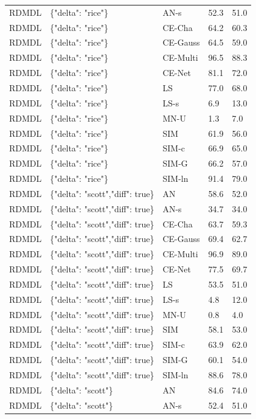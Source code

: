 \begin{tabular}{lllll}
RDMDL & \{"delta": "rice"\} & AN-s & 52.3 & 51.0 \\
RDMDL & \{"delta": "rice"\} & CE-Cha & 64.2 & 60.3 \\
RDMDL & \{"delta": "rice"\} & CE-Gauss & 64.5 & 59.0 \\
RDMDL & \{"delta": "rice"\} & CE-Multi & 96.5 & 88.3 \\
RDMDL & \{"delta": "rice"\} & CE-Net & 81.1 & 72.0 \\
RDMDL & \{"delta": "rice"\} & LS & 77.0 & 68.0 \\
RDMDL & \{"delta": "rice"\} & LS-s & 6.9 & 13.0 \\
RDMDL & \{"delta": "rice"\} & MN-U & 1.3 & 7.0 \\
RDMDL & \{"delta": "rice"\} & SIM & 61.9 & 56.0 \\
RDMDL & \{"delta": "rice"\} & SIM-c & 66.9 & 65.0 \\
RDMDL & \{"delta": "rice"\} & SIM-G & 66.2 & 57.0 \\
RDMDL & \{"delta": "rice"\} & SIM-ln & 91.4 & 79.0 \\
RDMDL & \{"delta": "scott","diff": true\} & AN & 58.6 & 52.0 \\
RDMDL & \{"delta": "scott","diff": true\} & AN-s & 34.7 & 34.0 \\
RDMDL & \{"delta": "scott","diff": true\} & CE-Cha & 63.7 & 59.3 \\
RDMDL & \{"delta": "scott","diff": true\} & CE-Gauss & 69.4 & 62.7 \\
RDMDL & \{"delta": "scott","diff": true\} & CE-Multi & 96.9 & 89.0 \\
RDMDL & \{"delta": "scott","diff": true\} & CE-Net & 77.5 & 69.7 \\
RDMDL & \{"delta": "scott","diff": true\} & LS & 53.5 & 51.0 \\
RDMDL & \{"delta": "scott","diff": true\} & LS-s & 4.8 & 12.0 \\
RDMDL & \{"delta": "scott","diff": true\} & MN-U & 0.8 & 4.0 \\
RDMDL & \{"delta": "scott","diff": true\} & SIM & 58.1 & 53.0 \\
RDMDL & \{"delta": "scott","diff": true\} & SIM-c & 63.9 & 62.0 \\
RDMDL & \{"delta": "scott","diff": true\} & SIM-G & 60.1 & 54.0 \\
RDMDL & \{"delta": "scott","diff": true\} & SIM-ln & 88.6 & 78.0 \\
RDMDL & \{"delta": "scott"\} & AN & 84.6 & 74.0 \\
RDMDL & \{"delta": "scott"\} & AN-s & 52.4 & 51.0 \\

\end{tabular}
